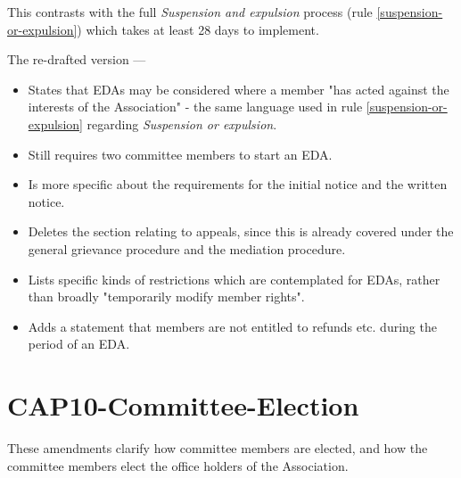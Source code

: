 \documentclass[../constitution.tex]{subfiles}
\begin{document}
This contrasts with the full \textit{Suspension and expulsion} process (rule \ref{suspension-or-expulsion}) which takes at least 28 days to implement.

The re-drafted version ---

\begin{itemize}
    \item States that EDAs may be considered where a member "has acted against the interests of the Association" - the same language used in rule \ref{suspension-or-expulsion} regarding \textit{Suspension or expulsion}.
    \item Still requires two committee members to start an EDA.
    \item Is more specific about the requirements for the initial notice and the written notice.
    \item Deletes the section relating to appeals, since this is already covered under the general grievance procedure and the mediation procedure.
    \item Lists specific kinds of restrictions which are contemplated for EDAs, rather than broadly "temporarily modify member rights".
    \item Adds a statement that members are not entitled to refunds etc. during the period of an EDA.
\end{itemize}

\section*{CAP10-Committee-Election}

These amendments clarify how committee members are elected, and how the committee members elect the office holders of the Association.
\end{document}
